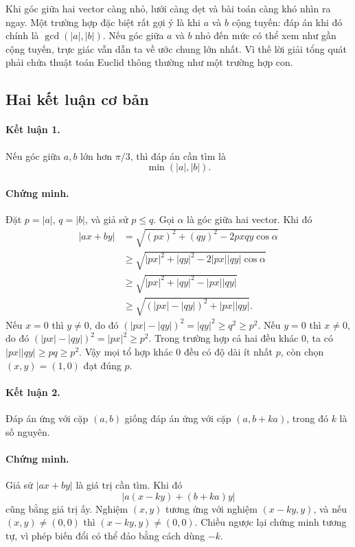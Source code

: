 \documentclass[11pt]{article}
\newcommand{\abs}[1]{\left|#1\right|}
\begin{document}
Khi góc giữa hai vector càng nhỏ, lưới càng dẹt và bài toán càng khó nhìn ra
ngay. Một trường hợp đặc biệt rất gợi ý là khi $a$ và $b$ cộng tuyến: đáp án
khi đó chính là $\gcd(\abs a,\abs b)$. Nếu góc giữa $a$ và $b$ nhỏ đến mức có
thể xem như gần cộng tuyến, trực giác vẫn dẫn ta về ước chung lớn nhất. Vì
thế lời giải tổng quát phải chứa thuật toán Euclid thông thường như một
trường hợp con.

\subsection{Hai kết luận cơ bản}

\paragraph{Kết luận 1.}
Nếu góc giữa $a,b$ lớn hơn $\pi/3$, thì đáp án cần tìm là
\[
  \min(\abs a,\abs b).
\]

\paragraph{Chứng minh.}
Đặt $p=\abs a$, $q=\abs b$, và giả sử $p\le q$. Gọi $\alpha$ là góc giữa hai
vector. Khi đó
\[
\begin{aligned}
  \abs{ax+by}
    &=\sqrt{(px)^2+(qy)^2-2pxqy\cos\alpha}\\
    &\ge \sqrt{\abs{px}^2+\abs{qy}^2-2\abs{px}\abs{qy}\cos\alpha}\\
    &\ge \sqrt{\abs{px}^2+\abs{qy}^2-\abs{px}\abs{qy}}\\
    &\ge \sqrt{(\abs{px}-\abs{qy})^2+\abs{px}\abs{qy}}.
\end{aligned}
\]
Nếu $x=0$ thì $y\ne0$, do đó
$(\abs{px}-\abs{qy})^2=\abs{qy}^2\ge q^2\ge p^2$. Nếu $y=0$ thì $x\ne0$,
do đó $(\abs{px}-\abs{qy})^2=\abs{px}^2\ge p^2$. Trong trường hợp cả hai đều
khác $0$, ta có $\abs{px}\abs{qy}\ge pq\ge p^2$. Vậy mọi tổ hợp khác $0$ đều
có độ dài ít nhất $p$, còn chọn $(x,y)=(1,0)$ đạt đúng $p$.

\paragraph{Kết luận 2.}
Đáp án ứng với cặp $(a,b)$ giống đáp án ứng với cặp $(a,b+ka)$, trong đó $k$
là số nguyên.

\paragraph{Chứng minh.}
Giả sử $\abs{ax+by}$ là giá trị cần tìm. Khi đó
\[
  \abs{a(x-ky)+(b+ka)y}
\]
cũng bằng giá trị ấy. Nghiệm $(x,y)$ tương ứng với nghiệm $(x-ky,y)$, và nếu
$(x,y)\ne(0,0)$ thì $(x-ky,y)\ne(0,0)$. Chiều ngược lại chứng minh tương tự,
vì phép biến đổi có thể đảo bằng cách dùng $-k$.
\end{document}
